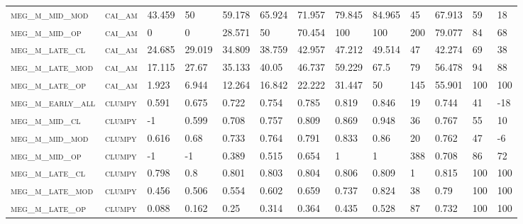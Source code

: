 \begin{landscape}
\begin{center}
\begin{footnotesize}
\begin{longtable}{lllllllllllll}
\textsc{meg\_m\_mid\_mod  } & \textsc{cai\_am   }   & 43.459   & 50       & 59.178   & 65.924   & 71.957   & 79.845   & 84.965   & 45     & 67.913        & 59            & 18              \\
\textsc{meg\_m\_mid\_op   } & \textsc{cai\_am   }   & 0        & 0        & 28.571   & 50       & 70.454   & 100      & 100      & 200    & 79.077        & 84            & 68              \\
\textsc{meg\_m\_late\_cl  } & \textsc{cai\_am   }   & 24.685   & 29.019   & 34.809   & 38.759   & 42.957   & 47.212   & 49.514   & 47     & 42.274        & 69            & 38              \\
\textsc{meg\_m\_late\_mod } & \textsc{cai\_am   }   & 17.115   & 27.67    & 35.133   & 40.05    & 46.737   & 59.229   & 67.5     & 79     & 56.478        & 94            & 88              \\
\textsc{meg\_m\_late\_op  } & \textsc{cai\_am   }   & 1.923    & 6.944    & 12.264   & 16.842   & 22.222   & 31.447   & 50       & 145    & 55.901        & 100           & 100             \\
\textsc{meg\_m\_early\_all} & \textsc{clumpy    }   & 0.591    & 0.675    & 0.722    & 0.754    & 0.785    & 0.819    & 0.846    & 19     & 0.744         & 41            & -18             \\
\textsc{meg\_m\_mid\_cl   } & \textsc{clumpy    }   & -1       & 0.599    & 0.708    & 0.757    & 0.809    & 0.869    & 0.948    & 36     & 0.767         & 55            & 10              \\
\textsc{meg\_m\_mid\_mod  } & \textsc{clumpy    }   & 0.616    & 0.68     & 0.733    & 0.764    & 0.791    & 0.833    & 0.86     & 20     & 0.762         & 47            & -6              \\
\textsc{meg\_m\_mid\_op   } & \textsc{clumpy    }   & -1       & -1       & 0.389    & 0.515    & 0.654    & 1        & 1        & 388    & 0.708         & 86            & 72              \\
\textsc{meg\_m\_late\_cl  } & \textsc{clumpy    }   & 0.798    & 0.8      & 0.801    & 0.803    & 0.804    & 0.806    & 0.809    & 1      & 0.815         & 100           & 100             \\
\textsc{meg\_m\_late\_mod } & \textsc{clumpy    }   & 0.456    & 0.506    & 0.554    & 0.602    & 0.659    & 0.737    & 0.824    & 38     & 0.79          & 100           & 100             \\
\textsc{meg\_m\_late\_op  } & \textsc{clumpy    }   & 0.088    & 0.162    & 0.25     & 0.314    & 0.364    & 0.435    & 0.528    & 87     & 0.732         & 100           & 100             \\

\end{longtable}
\end{footnotesize}
\end{center}
\end{landscape}
